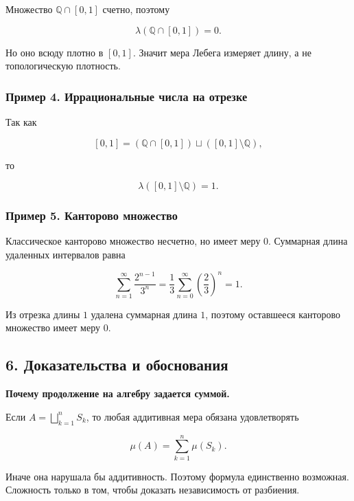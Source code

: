 \documentclass[
  11pt,
  a4paper,
]{article}
\begin{document}
Множество \(\mathbb Q\cap[0,1]\) счетно, поэтому

\[
\lambda(\mathbb Q\cap[0,1])=0.
\]

Но оно всюду плотно в \([0,1]\). Значит мера Лебега измеряет длину, а не
топологическую плотность.

\subsubsection{Пример 4. Иррациональные числа на
отрезке}\label{ux43fux440ux438ux43cux435ux440-4.-ux438ux440ux440ux430ux446ux438ux43eux43dux430ux43bux44cux43dux44bux435-ux447ux438ux441ux43bux430-ux43dux430-ux43eux442ux440ux435ux437ux43aux435}

Так как

\[
[0,1]=(\mathbb Q\cap[0,1])\sqcup([0,1]\setminus\mathbb Q),
\]

то

\[
\lambda([0,1]\setminus\mathbb Q)=1.
\]

\subsubsection{Пример 5. Канторово
множество}\label{ux43fux440ux438ux43cux435ux440-5.-ux43aux430ux43dux442ux43eux440ux43eux432ux43e-ux43cux43dux43eux436ux435ux441ux442ux432ux43e}

Классическое канторово множество несчетно, но имеет меру \(0\).
Суммарная длина удаленных интервалов равна

\[
\sum_{n=1}^{\infty}\frac{2^{n-1}}{3^n}
=
\frac13\sum_{n=0}^{\infty}\left(\frac23\right)^n
=1.
\]

Из отрезка длины \(1\) удалена суммарная длина \(1\), поэтому оставшееся
канторово множество имеет меру \(0\).

\subsection{6. Доказательства и
обоснования}\label{ux434ux43eux43aux430ux437ux430ux442ux435ux43bux44cux441ux442ux432ux430-ux438-ux43eux431ux43eux441ux43dux43eux432ux430ux43dux438ux44f}

\textbf{Почему продолжение на алгебру задается суммой.}

Если \(A=\bigsqcup_{k=1}^n S_k\), то любая аддитивная мера обязана
удовлетворять

\[
\mu(A)=\sum_{k=1}^n\mu(S_k).
\]

Иначе она нарушала бы аддитивность. Поэтому формула единственно
возможная. Сложность только в том, чтобы доказать независимость от
разбиения.
\end{document}
